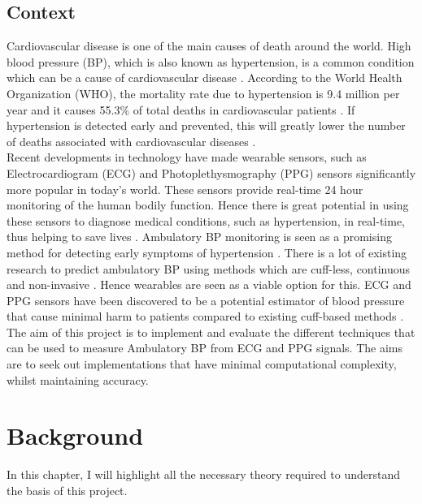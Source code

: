 \documentclass[11pt, a4paper]{article}
\begin{document}
\subsection{Context}
Cardiovascular disease is one of the main causes of death around the world. High blood pressure (BP), which is also known as hypertension, is a common condition which can be a cause of cardiovascular disease \cite{Sharma2017}. According to the World Health Organization (WHO), the mortality rate due to hypertension is 9.4 million per year and it causes 55.3\%  of  total  deaths  in  cardiovascular patients \cite{Janjua2017}. If hypertension is detected early and prevented, this will greatly lower the number of deaths associated with cardiovascular diseases \cite{Janjua2017}. \\ \newline \noindent Recent developments in technology have made wearable sensors, such as Electrocardiogram (ECG) and Photoplethysmography (PPG) sensors significantly more popular in today's world. These sensors provide real-time 24 hour monitoring of the human bodily function. Hence there is great potential in using these sensors to diagnose medical conditions, such as hypertension, in real-time, thus helping to save lives \cite{Simjanoska20182}. Ambulatory BP monitoring is seen as a promising method for detecting early symptoms of hypertension \cite{Kario2021}. There is a lot of existing research to predict ambulatory BP using methods which are cuff-less, continuous and non-invasive \cite{Zaki2018}. Hence wearables are seen as a viable option for this. ECG and PPG sensors have been discovered to be a potential estimator of blood pressure that cause minimal harm to patients compared to existing cuff-based methods \cite{Malikeh2019} \cite{Bard2019}.\\ \newline \noindent The aim of this project is to implement and evaluate the different techniques that can be used to measure Ambulatory BP from ECG and PPG signals. The aims are to seek out implementations that have minimal computational complexity, whilst maintaining accuracy.


\newpage

\section{Background}
In this chapter, I will highlight all the necessary theory required to understand the basis of this project.
\end{document}
